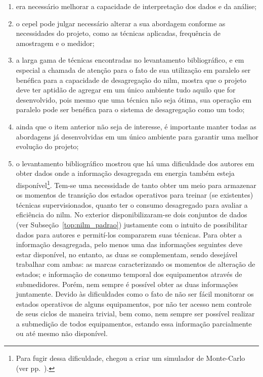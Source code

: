 \begin{enumerate}[label={Item} \arabic* - ,ref=\arabic*,align=left]
\item\label{itm:dif1} era necessário melhorar a capacidade de
interpretação dos dados e da análise;
\item\label{itm:dif2} o \acs{cepel} pode julgar necessário alterar a
sua abordagem conforme as necessidades do projeto, como as técnicas
aplicadas, frequência de amostragem e o medidor;
\item\label{itm:dif3} a larga gama de técnicas encontradas no
levantamento bibliográfico, e em especial a chamada de atenção para o
fato de sua utilização em paralelo ser benéfica para a capacidade de
desagregação do \gls{nilm}, mostra que o projeto deve ter aptidão de
agregar em um único ambiente tudo aquilo que for desenvolvido, pois
mesmo que uma técnica não seja ótima, sua operação em paralelo pode
ser benéfica para o sistema de desagregação como um todo;
\item\label{itm:dif4} ainda que o item anterior não seja de interesse,
é importante manter todas as abordagens já desenvolvidas em um único
ambiente para garantir uma melhor evolução do projeto;
\item\label{itm:dif5} o levantamento bibliográfico mostrou que há uma
dificuldade dos autores em obter dados onde a informação desagregada
em energia também esteja disponível\footnote{Para fugir dessa
dificuldade, \cite{nilm_liang_pt2_2010_40} chegou a criar um simulador
de Monte-Carlo (ver pp.~\pageref{nilm:multiplas_tecnicas}).}. Tem-se uma
necessidade de tanto obter um meio para armazenar os momentos de
transição dos estados operativos para treinar (se existentes) técnicas
supervisionados, quanto ter o consumo desagregado para avaliar a
eficiência do \gls{nilm}. No exterior disponibilizaram-se dois
conjuntos de dados (ver Subseção~\ref{top:nilm_padrao}) justamente
com o intuito de possibilitar dados para autores e permití-los
compararem suas técnicas. Para obter a informação desagregada, pelo
menos uma das informações seguintes deve estar disponível, no entanto,
as duas se complementam, sendo desejável trabalhar com ambas: as
marcas caracterizando os momentos de alteração de estados;
e informação de consumo temporal dos equipamentos através de submedidores.
Porém, nem sempre é possível obter as duas informações juntamente.
Devido às dificuldades como o fato de não ser fácil monitorar os estados
operativos de alguns equipamentos, por não ter acesso nem controle de seus
ciclos de maneira trivial, bem como, nem sempre ser possível realizar a
submedição de todos equipamentos, estando essa informação parcialmente ou
até mesmo não disponível.
\end{enumerate}

